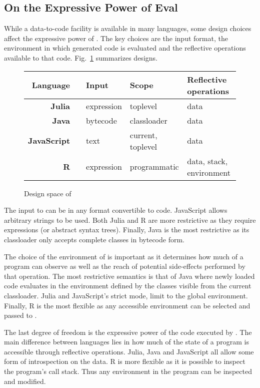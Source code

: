 \documentclass[review,screen,acmsmall,anonymous=true]{acmart}
\begin{document}
\subsection{On the Expressive Power of Eval}

While a data-to-code facility is available in many languages, some design
choices affect the expressive power of \eval. The key choices are the input
format, the environment in which generated code is evaluated and the reflective
operations available to that code. Fig.~\ref{comp} summarizes designs.

\begin{figure}[!h]\center\small\begin{tabular}{r@{~}l|l|l|l}\hline
\tiny\sc Language&&\sc\tiny Input&\sc\tiny Scope&\tiny\sc Reflective operations\\\hline
\bf Julia&\cite{julia}     & expression& toplevel         & data\\
\bf Java&\cite{cl}  & bytecode  & classloader       & data\\
\bf JavaScript&\cite{ecoop11}& text      & current, toplevel& data\\
\bf R&\cite{R96}  & expression& programmatic      & data, stack, environment\\\hline
\end{tabular}\caption{Design space of \eval}\label{comp}
\end{figure}

The input to \eval can be in any format convertible to code. JavaScript allows
arbitrary strings to be used. Both Julia and R are more restrictive as they
require expressions (or abstract syntax trees). Finally, Java is the most
restrictive as its classloader only accepts complete classes in bytecode form.

The choice of the environment of \eval is important as it determines how much of
a program \eval can observe as well as the reach of potential side-effects
performed by that operation. The most restrictive semantics is that of Java
where newly loaded code evaluates in the environment defined by the classes
visible from the current classloader. Julia and JavaScript's strict mode, limit
\eval to the global environment. Finally, R is the most flexible as any
accessible environment can be selected and passed to \eval.

The last degree of freedom is the expressive power of the code executed by
\eval. The main difference between languages lies in how much of the state of a
program is accessible through reflective operations. Julia, Java and JavaScript
all allow some form of introspection on the data. R is more flexible as it is
possible to inspect the program's call stack. Thus any environment in the
program can be inspected and modified.
\end{document}
